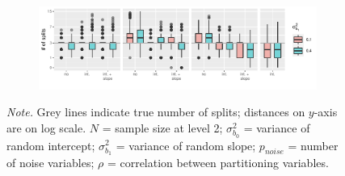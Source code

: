 \documentclass[doc,floatsintext,natbib]{apa7}
\begin{document}
\begin{figure}[!ht]
\begin{subfigure}{1.25\textwidth}
\end{subfigure}
\begin{subfigure}{1.25\textwidth}
\includegraphics{_Partitioning_GCMs_with_GLMM_trees-041}
\end{subfigure}
{\footnotesize \textit{Note.} Grey lines indicate true number of splits; distances on $y$-axis are on log scale. $N$ = sample size at level 2; $\sigma_{b_0}^2$ = variance of random intercept; $\sigma_{b_1}^2$ = variance of random slope; $p_{noise}$ = number of noise variables; $\rho$ = correlation between partitioning variables.}
\label{fig:tree_sizes_interact}
\end{figure}







\FloatBarrier
\end{document}
